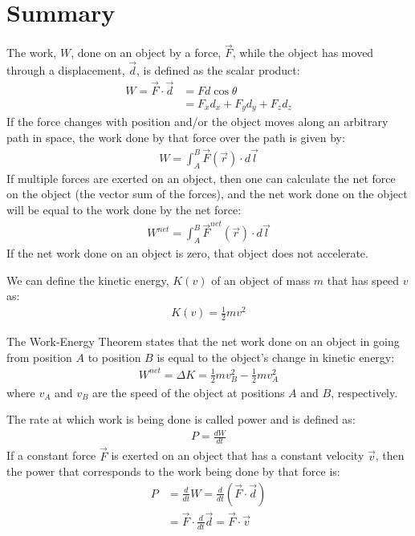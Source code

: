 \section{Summary}
\begin{chapterSummary}{
The work, $W$, done on an object by a force, $\vec F$, while the object has moved through a displacement, $\vec d$, is defined as the scalar product:
\begin{align*}
W = \vec F \cdot \vec d &= Fd\cos\theta\\
&= F_xd_x+F_yd_y+F_zd_z
\end{align*}
If the force changes with position and/or the object moves along an arbitrary path in space, the work done by that force over the path is given by:
\begin{align*}
W =\int_A^B \vec F(\vec r) \cdot  d\vec l
\end{align*}
If multiple forces are exerted on an object, then one can calculate the net force on the object (the vector sum of the forces), and the net work done on the object will be equal to the work done by the net force:
\begin{align*}
W^{net} = \int_A^B \vec F^{net}(\vec r) \cdot d\vec l
\end{align*}
If the net work done on an object is zero, that object does not accelerate.

We can define the kinetic energy, $K(v)$ of an object of mass $m$ that has speed $v$ as:
\begin{align*}
K(v) = \frac{1}{2} mv^2
\end{align*}

The Work-Energy Theorem states that the net work done on an object in going from position $A$ to position $B$ is equal to the object's change in kinetic energy:
\begin{align*}
W^{net} = \Delta K = \frac{1}{2} mv_B^2 - \frac{1}{2} mv_A^2
\end{align*}
where $v_A$ and $v_B$ are the speed of the object at positions $A$ and $B$, respectively.

The rate at which work is being done is called power and is defined as:
\begin{align*}
P = \frac{dW}{dt}
\end{align*}
If a constant force $\vec F$ is exerted on an object that has a constant velocity $\vec v$, then the power that corresponds to the work being done by that force is:
\begin{align*}
P &= \frac{d}{dt} W = \frac{d}{dt}(\vec F \cdot \vec d)\\
&= \vec F \cdot \frac{d}{dt}\vec d = \vec F \cdot \vec v
\end{align*}
}
\end{chapterSummary}



